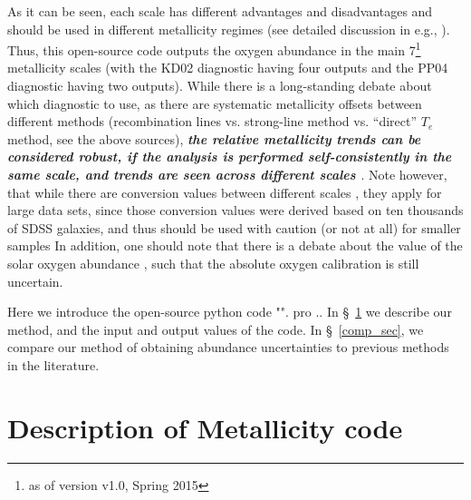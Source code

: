 \documentclass{emulateapj}
\begin{document}
As it can be seen, each scale has different advantages and disadvantages and should be used in different metallicity regimes (see detailed discussion in e.g.,  \citealt{kewley02,stasinska02,kewley08,moustakas10,dopita13,blanc15}). Thus, this open-source code outputs the oxygen abundance in the main 7\footnote{as of version v1.0, Spring 2015} metallicity scales (with the KD02 diagnostic having four outputs and the PP04 diagnostic having two outputs). While there is a long-standing debate about which diagnostic to use, as there are systematic metallicity offsets between different methods (recombination lines vs. strong-line method vs. ``direct'' $T_e$ method, see the above sources), \emph{\bf the relative metallicity trends can be considered robust, if the analysis is performed self-consistently in the same scale, and trends are seen across different scales \citep{kewley08,moustakas10}}. Note however, that while there are conversion values between different scales \citep{kewley08}, they apply for large data sets, since those conversion values were derived based on ten thousands of SDSS galaxies, and thus should be used with caution (or not at all) for smaller samples
In addition, one should note that there is a debate about the value of the solar oxygen abundance \citep{asplund09_rev,chaffau11}, such that the absolute oxygen calibration is still uncertain.



Here we introduce the open-source python code "". pro .. In \S~\ref{method_sec} we describe our method, and the input and output values of the code. In \S~\ref{comp_sec}, we compare our method of obtaining abundance uncertainties to previous methods in the literature. 



\section{Description of Metallicity code}\label{method_sec}
\end{document}
